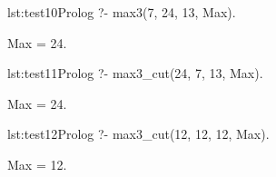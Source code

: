 \begin{listing}{lst:test10}{Prolog}
?- max3(7, 24, 13, Max).

Max = 24.
\end{listing}

\begin{listing}{lst:test11}{Prolog}
?- max3_cut(24, 7, 13, Max).

Max = 24.
\end{listing}

\begin{listing}{lst:test12}{Prolog}
?- max3_cut(12, 12, 12, Max).

Max = 12.
\end{listing}
